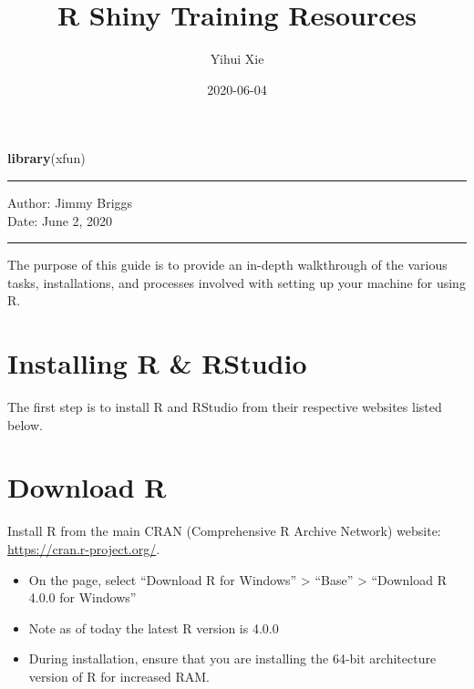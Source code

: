 \documentclass[
]{book}
\title{R Shiny Training Resources}
\author{Yihui Xie}
\date{2020-06-04}
\newenvironment{Shaded}{\begin{snugshade}}{\end{snugshade}}
\newcommand{\KeywordTok}[1]{\textcolor[rgb]{0.13,0.29,0.53}{\textbf{#1}}}
\newcommand{\NormalTok}[1]{#1}
\begin{document}
\maketitle

{
\setcounter{tocdepth}{1}
\tableofcontents
}
\begin{Shaded}
\begin{Highlighting}[]
\KeywordTok{library}\NormalTok{(xfun)}
\end{Highlighting}
\end{Shaded}

\begin{center}\rule{0.5\linewidth}{0.5pt}\end{center}

Author: Jimmy Briggs\\
Date: June 2, 2020

\begin{center}\rule{0.5\linewidth}{0.5pt}\end{center}

The purpose of this guide is to provide an in-depth walkthrough of the
various tasks, installations, and processes involved with setting up your
machine for using R.

\hypertarget{installing-r-rstudio}{%
\section{Installing R \& RStudio}\label{installing-r-rstudio}}

The first step is to install R and RStudio from their respective websites listed below.

\hypertarget{download-r}{%
\section{Download R}\label{download-r}}

Install R from the main CRAN (Comprehensive R Archive Network) website:
\url{https://cran.r-project.org/}.

\begin{itemize}
\item
  On the page, select ``Download R for Windows'' \textgreater{} ``Base'' \textgreater{} ``Download R 4.0.0 for Windows''
\item
  Note as of today the latest R version is 4.0.0
\item
  During installation, ensure that you are installing the 64-bit architecture
  version of R for increased RAM.
\end{itemize}
\end{document}
